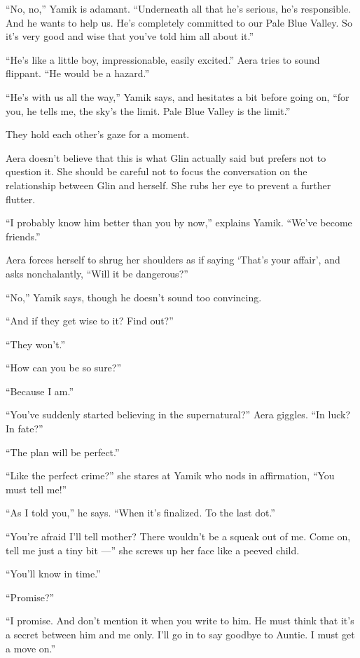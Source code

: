 \documentclass[twoside,11pt,openany]{book}
\begin{document}
``No, no,'' Yamik is adamant. ``Underneath all that he's serious, he's
responsible. And he wants to help us. He's completely committed to our Pale Blue Valley. So it's very good and wise
that you've told him all about it.''

``He's like a little boy, impressionable, easily excited.'' Aera tries to sound flippant.
``He would be a hazard.''

``He's with us all the way,'' Yamik says, and hesitates a bit before going
on,{ }``for you, he tells me, the sky's the limit. Pale Blue Valley is the limit.''

They hold each other's gaze for a moment.

Aera doesn't believe that this is what Glin actually said but prefers not to question it. She should be careful not to
focus the conversation on the relationship between Glin and herself. She rubs her eye to prevent a further flutter.

``I probably know him better than you by now,'' explains Yamik. ``We've become
friends.''

Aera forces herself to shrug her shoulders as if saying `That's your affair', and asks nonchalantly, ``Will
it be dangerous?''

``No,'' Yamik says, though he doesn't sound too convincing.

``And if they get wise{ }to it? Find out?''

``They won't.''

``How can you be so sure?''

``Because I am.''

``You've suddenly started believing in the supernatural?'' Aera giggles. ``In
luck? In fate?''

``The plan will be perfect.''

``Like the perfect crime?'' she stares at Yamik who nods in affirmation, ``You must tell me!''


``As I told you,'' he says. ``When it's finalized.  To the last dot.''

``You're afraid I'll tell mother? There wouldn't be a squeak out of me. Come on, tell me just a tiny bit ---'' she screws up her face like a peeved child.

``You'll know in time.''

``Promise?''

``I promise. And don't mention it when you write to him. He must think that it's a secret between him and
me only. I'll go in to say goodbye to Auntie. I must get a move on.''
\end{document}
